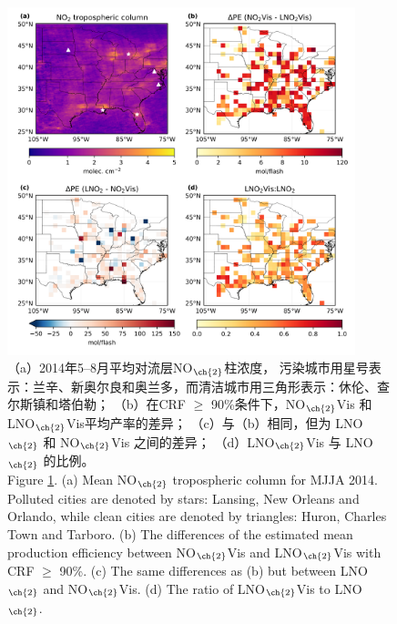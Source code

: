 \begin{figure}[H]
\centering
\includegraphics[width=0.9\textwidth]{./figures/us_delta.png}
\caption{（a）2014年5--8月平均对流层NO$_{\ch{2}}$柱浓度，
污染城市用星号表示：兰辛、新奥尔良和奥兰多，而清洁城市用三角形表示：休伦、查尔斯镇和塔伯勒；
（b）在CRF $\geq$ 90\%条件下，NO$_{\ch{2}}$Vis 和 LNO$_{\ch{2}}$Vis平均产率的差异；
（c）与（b）相同，但为 LNO$_{\ch{2}}$ 和 NO$_{\ch{2}}$Vis 之间的差异；
（d）LNO$_{\ch{2}}$Vis 与 LNO$_{\ch{2}}$ 的比例。\\
Figure \ref{fig:us_delta}.
(a) Mean NO$_{\ch{2}}$ tropospheric column for MJJA 2014.
Polluted cities are denoted by stars: Lansing, New Orleans and Orlando, while clean cities are denoted by triangles: Huron, Charles Town and Tarboro.
(b) The differences of the estimated mean production efficiency between NO$_{\ch{2}}$Vis and LNO$_{\ch{2}}$Vis with CRF $\geq$ 90\%.
(c) The same differences as (b) but between LNO$_{\ch{2}}$ and NO$_{\ch{2}}$Vis.
(d) The ratio of LNO$_{\ch{2}}$Vis to LNO$_{\ch{2}}$.
}
\label{fig:us_delta}
\end{figure}


